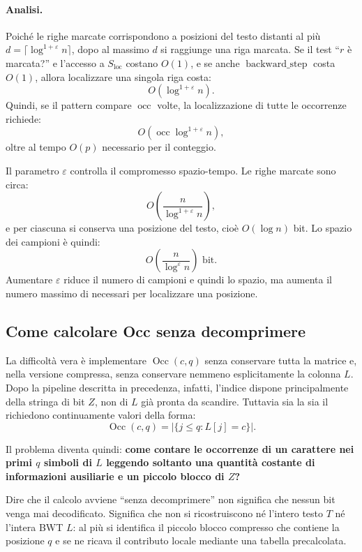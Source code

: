 \documentclass{article}
\theoremstyle{definition}
\numberwithin{equation}{section}
\begin{document}
\paragraph{Analisi.}
Poiché le righe marcate corrispondono a posizioni del testo distanti al più $d=\lceil\log^{1+\varepsilon}n\rceil$, dopo al massimo $d$  si raggiunge una riga marcata. Se il test ``$r$ è marcata?'' e l'accesso a $S_{\operatorname{loc}}$ costano $O(1)$, e se anche $\operatorname{backward\_step}$ costa $O(1)$, allora localizzare una singola riga costa:
\begin{equation}\label{eq:fm_marked_rows_bound}
    O(\log^{1+\varepsilon} n).
\end{equation}
Quindi, se il pattern compare $\operatorname{occ}$ volte, la localizzazione di tutte le occorrenze richiede:
\[
    O\!\left(\operatorname{occ}\log^{1+\varepsilon} n\right),
\]
oltre al tempo $O(p)$ necessario per il conteggio.

Il parametro $\varepsilon$ controlla il compromesso spazio-tempo. Le righe marcate sono circa:
\[
    O\!\left(\frac{n}{\log^{1+\varepsilon}n}\right),
\]
e per ciascuna si conserva una posizione del testo, cioè $O(\log n)$ bit. Lo spazio dei campioni è quindi:
\[
    O\!\left(\frac{n}{\log^\varepsilon n}\right)
    \text{ bit}.
\]
Aumentare $\varepsilon$ riduce il numero di campioni e quindi lo spazio, ma aumenta il numero massimo di  necessari per localizzare una posizione.

\subsection{Come calcolare Occ senza decomprimere}
La difficoltà vera è implementare $\operatorname{Occ}(c,q)$ senza conservare tutta la matrice e, nella versione compressa, senza conservare nemmeno esplicitamente la colonna $L$. Dopo la pipeline descritta in precedenza, infatti, l'indice dispone principalmente della stringa di bit $Z$, non di $L$ già pronta da scandire. Tuttavia sia la  sia il  richiedono continuamente valori della forma:
\[
    \operatorname{Occ}(c,q)
    =
    |\{j\leq q:L[j]=c\}|.
\]

Il problema diventa quindi: \textbf{come contare le occorrenze di un carattere nei primi $q$ simboli di $L$ leggendo soltanto una quantità costante di informazioni ausiliarie e un piccolo blocco di $Z$?}

Dire che il calcolo avviene ``senza decomprimere'' non significa che nessun bit venga mai decodificato. Significa che non si ricostruiscono né l'intero testo $T$ né l'intera BWT $L$: al più si identifica il piccolo blocco compresso che contiene la posizione $q$ e se ne ricava il contributo locale mediante una tabella precalcolata.
\end{document}
